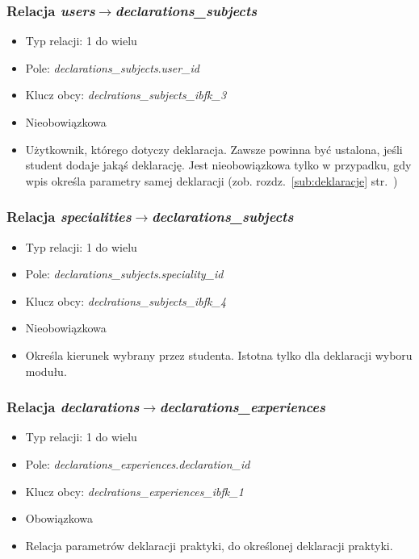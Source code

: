 \documentclass[a4paper,12pt,oneside]{report}
\begin{document}
\subsubsection{Relacja \emph{users}$\to$\emph{declarations\_subjects}}
\label{subsub:users-declarations_subjects}
\begin{itemize}
  \item Typ relacji: 1 do wielu
  \item Pole: \emph{declarations\_subjects}.\emph{user\_id}
  \item Klucz obcy: \emph{declrations\_subjects\_ibfk\_3}
  \item Nieobowiązkowa
  \item Użytkownik, którego dotyczy deklaracja. Zawsze powinna być ustalona, jeśli student dodaje jakąś deklarację. Jest nieobowiązkowa tylko w przypadku, gdy wpis określa parametry samej deklaracji (zob. rozdz.~\ref{sub:deklaracje} str.~\pageref{sub:deklaracje})
\end{itemize}

\subsubsection{Relacja \emph{specialities}$\to$\emph{declarations\_subjects}}
\label{subsub:specialities-declarations_subjects}
\begin{itemize}
  \item Typ relacji: 1 do wielu
  \item Pole: \emph{declarations\_subjects}.\emph{speciality\_id}
  \item Klucz obcy: \emph{declrations\_subjects\_ibfk\_4}
  \item Nieobowiązkowa
  \item Określa kierunek wybrany przez studenta. Istotna tylko dla deklaracji wyboru modułu.
\end{itemize}

\subsubsection{Relacja \emph{declarations}$\to$\emph{declarations\_experiences}}
\label{subsub:declarations-declarations_experiences}
\begin{itemize}
  \item Typ relacji: 1 do wielu
  \item Pole: \emph{declarations\_experiences}.\emph{declaration\_id}
  \item Klucz obcy: \emph{declrations\_experiences\_ibfk\_1}
  \item Obowiązkowa
  \item Relacja parametrów deklaracji praktyki, do określonej deklaracji praktyki.
\end{itemize}
\end{document}
